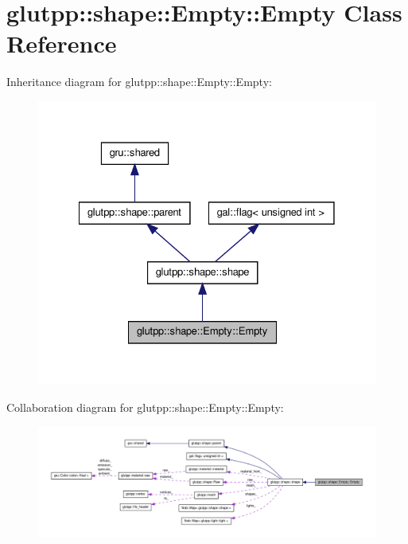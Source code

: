 \hypertarget{classglutpp_1_1shape_1_1Empty_1_1Empty}{\section{glutpp\-:\-:shape\-:\-:\-Empty\-:\-:\-Empty \-Class \-Reference}
\label{classglutpp_1_1shape_1_1Empty_1_1Empty}
}


\-Inheritance diagram for glutpp\-:\-:shape\-:\-:\-Empty\-:\-:\-Empty\-:\nopagebreak
\begin{figure}[H]
\begin{center}
\leavevmode
\includegraphics[width=328pt]{classglutpp_1_1shape_1_1Empty_1_1Empty__inherit__graph}
\end{center}
\end{figure}


\-Collaboration diagram for glutpp\-:\-:shape\-:\-:\-Empty\-:\-:\-Empty\-:\nopagebreak
\begin{figure}[H]
\begin{center}
\leavevmode
\includegraphics[width=350pt]{classglutpp_1_1shape_1_1Empty_1_1Empty__coll__graph}
\end{center}
\end{figure}
